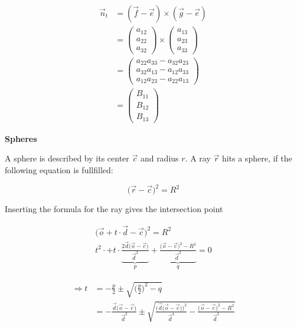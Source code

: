 \documentclass[11pt,a4paper,oneside]{article}
\begin{document}
\begin{align}
\vec{n}_t &= (\vec{f} - \vec{e}) \times (\vec{g} - \vec{e})\\
&= \begin{pmatrix} a_{12} \\ a_{22} \\ a_{32} \end{pmatrix} \times \begin{pmatrix} a_{13} \\ a_{23} \\ a_{33} \end{pmatrix} \\
&= \begin{pmatrix} a_{22} a_{33} - a_{32} a_{23} \\ a_{32} a_{13} - a_{12} a_{33} \\ a_{12} a_{23} - a_{22} a_{13} \end{pmatrix} \\
&= \begin{pmatrix} B_{11} \\ B_{12} \\ B_{13} \end{pmatrix}
\end{align}


\textbf{Spheres}

A sphere is described by its center $\vec{c}$ and radius $r$. A ray $\vec{r}$ hits a sphere, if the following equation is fullfilled:

\begin{equation}
\big( \vec{r} - \vec{c} \big)^2 = R^2
\end{equation}

Inserting the formula for the ray gives the intersection point

\begin{align}
\big( \vec{o} + t \cdot \vec{d} - \vec{c} \big)^2 = R^2 \\
t^2 \cdot + t \cdot \underbrace{ \frac{ 2 \vec{d}\big( \vec{o} - \vec{c} \big) }{\vec{d}^2} }_{p} + \underbrace{\frac{ \big( \vec{o} - \vec{c} \big)^2 - R^2 }{\vec{d}^2} }_{q} = 0
\end{align}

\begin{align}
\Rightarrow t &= - \frac{p}{2} \pm \sqrt{\Big( \frac{p}{2} \Big)^2 - q}\\
&= -\frac{ \vec{d}\big( \vec{o} - \vec{c} \big) }{ \vec{d}^2} \pm \sqrt{\frac{ \big( \vec{d}\big( \vec{o} - \vec{c} \big) \big)^2 }{\vec{d}^4} - \frac{ \big( \vec{o} - \vec{c} \big)^2 - R^2 }{\vec{d}^2}}
\end{align}
\end{document}
